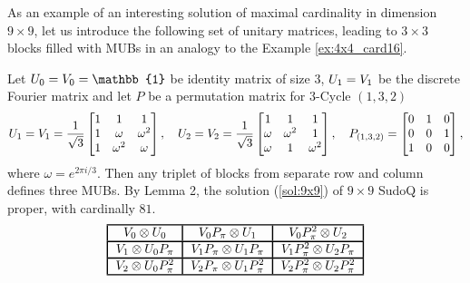 \documentclass[11pt]{article}
\begin{document}
As an example of an interesting solution of maximal cardinality in dimension $9 \times 9$, let us introduce the following set of unitary matrices, leading to $3 \times 3$ blocks filled with MUBs in an analogy to the Example \ref{ex:4x4_card16}. 
\begin{example}
Let $\mathnormal{U}_0=\mathnormal{V}_0=\mathbb{1}$ be identity matrix of size $3$,  $\mathnormal{U}_1=\mathnormal{V}_1$ be the discrete Fourier matrix and let $P$ be a permutation matrix for $3$-Cycle $(1,3,2)$
\[
\mathnormal{U}_1=\mathnormal{V}_1=
\frac{1}{\sqrt{3}}
\begin{bmatrix}
    1 & 1 & 1 \\
    1 & \omega & \omega^2 \\
    1 & \omega^2 & \omega
\end{bmatrix},
    \quad    
    \mathnormal{U}_2=\mathnormal{V}_2=
\frac{1}{\sqrt{3}}
\begin{bmatrix}
    1 & 1 & 1 \\
    \omega & \omega^2 & 1 \\
    \omega & 1 & \omega^2
\end{bmatrix}, 
    \quad
P_{(1,3,2)} = 
\begin{bmatrix}
    0 & 1 & 0 \\
    0 & 0 & 1 \\
    1 & 0 & 0
\end{bmatrix},
\]
where $\omega=e^{2\pi i/3}$. Then any triplet of blocks from separate row and column defines three MUBs. By Lemma 2, the solution (\ref{sol:9x9}) of $9\times9$ SudoQ is proper, with cardinally $81$. 
\begin{equation}\label{sol:9x9}
\begin{tabular}{!{\vrule width 1pt}c!{\vrule width 1pt}c!{\vrule width 1pt}c!{\vrule width 1pt}c!{\vrule width 1pt}c!{\vrule width 1pt}}
    \noalign{\hrule height 1pt}
    $\mathnormal{V}_0\otimes\mathnormal{U}_0$ & $\mathnormal{V}_0\mathnormal{P}_\pi\otimes\mathnormal{U}_1$ & $\mathnormal{V}_0\mathnormal{P}_\pi^2\otimes\mathnormal{U}_2$ \tabularnewline
    \noalign{\hrule height 1pt}
    $\mathnormal{V}_1\otimes\mathnormal{U}_0\mathnormal{P}_\pi$ & $\mathnormal{V}_1\mathnormal{P}_\pi\otimes\mathnormal{U}_1\mathnormal{P}_\pi$ & $\mathnormal{V}_1\mathnormal{P}_\pi^2\otimes\mathnormal{U}_2\mathnormal{P}_\pi$ \tabularnewline
    \noalign{\hrule height 1pt}
    $\mathnormal{V}_2\otimes\mathnormal{U}_0\mathnormal{P}_\pi^2$ & $\mathnormal{V}_2\mathnormal{P}_\pi\otimes\mathnormal{U}_1\mathnormal{P}_\pi^2$ & $\mathnormal{V}_2\mathnormal{P}_\pi^2\otimes\mathnormal{U}_2\mathnormal{P}_\pi^2$ \tabularnewline
    \noalign{\hrule height 1pt}
    \end{tabular}
\end{equation}
\end{example}

\printbibliography
\end{document}
